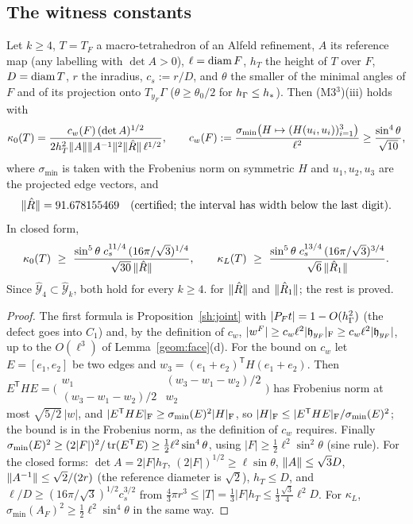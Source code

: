 \subsection{The witness constants}
\begin{proposition}\label{ct:kappa}
Let $k\ge4$, $T=T_F$ a macro-tetrahedron of an Alfeld refinement, $A$ its reference map (any labelling with $\det A>0$), $\ell=\operatorname{diam} F$, $h_T$ the height of $T$ over $F$, $D=\operatorname{diam} T$, $r$ the inradius, $c_s:=r/D$, and $\theta$ the smaller of the minimal angles of $F$ and of its projection onto $T_{y_F}\Gamma$ ($\theta\ge\theta_0/2$ for $h_\Gamma\le h_\ast$). Then (M3$^3$)(iii) holds with
\[
\kappa_0(T)=\frac{c_w(F)\,(\det A)^{1/2}}{2h_T^2\lVert A\rVert\lVert A^{-1}\rVert^2\lVert \hat R\rVert\,\ell^{1/2}},\qquad c_w(F):=\frac{\sigma_{\min}\bigl(H\mapsto(H(u_i,u_i))_{i=1}^3\bigr)}{\ell^2}\ge\frac{\sin^4\theta}{\sqrt{10}},
\]
where $\sigma_{\min}$ is taken with the Frobenius norm on symmetric $H$ and $u_1,u_2,u_3$ are the projected edge vectors, and
\[
\lVert \hat R\rVert=91.678155469\quad\text{(certified; the interval has width below the last digit)}.
\]
In closed form,
\[
\kappa_0(T)\ \ge\ \frac{\sin^5\theta\;c_s^{11/4}\,(16\pi/\sqrt3)^{1/4}}{\sqrt{30}\,\norm{\hat R}},\qquad
\kappa_L(T)\ \ge\ \frac{\sin^5\theta\;c_s^{13/4}\,(16\pi/\sqrt3)^{3/4}}{\sqrt6\,\norm{\hat R_1}} .
\]
Since $\hat{\mathcal Y}_4\subset\hat{\mathcal Y}_k$, both hold for every $k\ge4$.  for $\lVert \hat R\rVert$ and $\lVert \hat R_1\rVert$; the rest is proved.
\end{proposition}
\begin{proof}
The first formula is Proposition~\ref{sh:joint} with $|P_Ft|=1-O(h_\Gamma^2)$ (the defect goes into $C_1$) and, by the definition of $c_w$, $|w^F|\ge c_w\ell^2|\mathfrak h_{y_F}|_{\rm F}\ge c_w\ell^2|\mathfrak h_{y_F}|$, up to the $O(\ell^3)$ of Lemma~\ref{geom:face}(d). For the bound on $c_w$ let $E=[e_1,e_2]$ be two edges and $w_3=(e_1+e_2)^{\mathsf T}H(e_1+e_2)$. Then $E^{\mathsf T}HE=\bigl(\begin{smallmatrix}w_1&(w_3-w_1-w_2)/2\\ (w_3-w_1-w_2)/2&w_2\end{smallmatrix}\bigr)$ has Frobenius norm at most $\sqrt{5/2}\,|w|$, and $|E^{\mathsf T}HE|_{\rm F}\ge\sigma_{\min}(E)^2|H|_{\rm F}$, so $|H|_{\rm F}\le|E^{\mathsf T}HE|_{\rm F}/\sigma_{\min}(E)^2$; the bound is in the Frobenius norm, as the definition of $c_w$ requires. Finally $\sigma_{\min}(E)^2\ge(2|F|)^2/\operatorname{tr}(E^{\mathsf T}E)\ge\frac12\ell^2\sin^4\theta$, using $|F|\ge\frac12\ell^2\sin^2\theta$ (sine rule). For the closed forms: $\det A=2|F|h_T$, $(2|F|)^{1/2}\ge\ell\sin\theta$, $\lVert A\rVert\le\sqrt3D$, $\lVert A^{-1}\rVert\le\sqrt2/(2r)$ \cite[Theorem~3.1.3]{Ciarlet1978book} (the reference diameter is $\sqrt2$), $h_T\le D$, and $\ell/D\ge(16\pi/\sqrt3)^{1/2}c_s^{3/2}$ from $\frac43\pi r^3\le|T|=\frac13|F|h_T\le\frac13\frac{\sqrt3}4\ell^2D$. For $\kappa_L$, $\sigma_{\min}(A_F)^2\ge\frac12\ell^2\sin^4\theta$ in the same way.
\end{proof}
